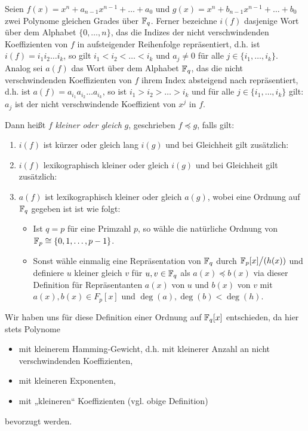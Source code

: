 \begin{definition}
  \label{def:polynomordnung}
  Seien $f(x) = x^n+a_{n-1}x^{n-1}+\ldots+a_0$ und
  $g(x) = x^n + b_{n-1}x^{n-1}+\ldots+b_0$ zwei Polynome gleichen Grades über 
  $\mathbb{F}_q$. Ferner bezeichne $i(f)$ dasjenige Wort über dem Alphabet
  $\{ 0,\ldots,n\}$, das die Indizes der nicht verschwindenden 
  Koeffizienten von $f$ in
  aufsteigender Reihenfolge repräsentiert, d.h. ist $i(f) = i_1i_2\ldots i_k$,
  so gilt $i_1<i_2<\ldots<i_k$ und $a_{j} \neq 0$ für alle 
  $j \in \{i_1,\ldots,i_k\}$. Analog sei $a(f)$ das Wort über dem Alphabet 
  $\mathbb{F}_q$, das die nicht verschwindenden Koeffizienten von $f$ 
  ihrem Index absteigend nach repräsentiert, d.h. ist 
  $a(f) = a_{i_1}a_{i_2}\ldots a_{i_k}$, so ist 
  $i_1>i_2>\ldots>i_k$ und für alle $j \in \{i_1,\ldots,i_k\}$ gilt:
  $a_{j}$ ist der nicht verschwindende Koeffizient
  von $x^{j}$ in $f$.

  Dann heißt $f$ \emph{kleiner oder gleich} $g$, 
  geschrieben $f\preceq g$, falls gilt:
  \begin{enumerate}
    \item $i(f)$ ist kürzer oder gleich lang $i(g)$
      und bei Gleichheit gilt zusätzlich:
    \item $i(f)$ lexikographisch kleiner oder gleich $i(g)$ und bei
      Gleichheit gilt zusätzlich:
    \item $a(f)$ ist lexikographisch kleiner oder gleich $a(g)$, 
      wobei eine Ordnung auf $\mathbb{F}_q$ gegeben ist ist wie folgt:
      \begin{itemize}
        \item Ist $q = p$ für eine Primzahl $p$, so wähle die natürliche Ordnung von
          $\mathbb{F}_p \cong \{ 0,1,\ldots,p-1\}$.
        \item Sonst wähle einmalig eine Repräsentation von 
          $\mathbb{F}_q$ durch $\mathbb{F}_p[x]\big/(h(x))$ und definiere 
          $u$ kleiner gleich $v$ für $u,v\in \mathbb{F}_q$ als
          $a(x) \preceq b(x)$ via dieser Definition für
          Repräsentanten $a(x)$ von $u$ und $b(x)$ von $v$ mit
          $a(x),b(x) \in F_p[x]$ und $\deg(a),\deg(b) < \deg(h)$.
      \end{itemize}
  \end{enumerate}
\end{definition}


Wir haben uns für diese Definition einer Ordnung auf $\mathbb{F}_q[x]$ entschieden, da
hier stets Polynome 
\begin{itemize}
  \item mit kleinerem Hamming-Gewicht, d.h. mit kleinerer Anzahl an 
    nicht verschwindenden Koeffizienten, 
  \item mit kleineren Exponenten,
  \item mit „kleineren“ Koeffizienten (vgl. obige Definition)
\end{itemize}
bevorzugt werden.

